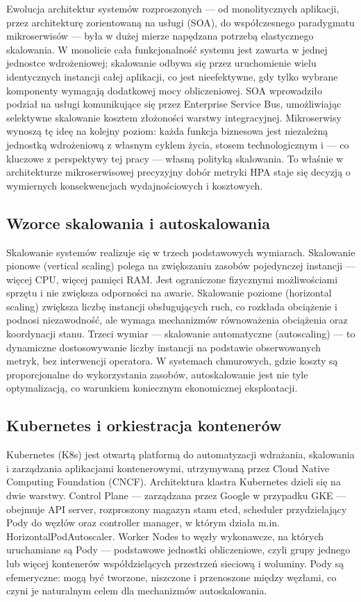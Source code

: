 Ewolucja architektur systemów rozproszonych --- od monolitycznych aplikacji, przez architekturę zorientowaną na usługi (SOA), do współczesnego paradygmatu mikroserwisów --- była w dużej mierze napędzana potrzebą elastycznego skalowania. W monolicie cała funkcjonalność systemu jest zawarta w jednej jednostce wdrożeniowej; skalowanie odbywa się przez uruchomienie wielu identycznych instancji całej aplikacji, co jest nieefektywne, gdy tylko wybrane komponenty wymagają dodatkowej mocy obliczeniowej. SOA wprowadziło podział na usługi komunikujące się przez Enterprise Service Bus, umożliwiając selektywne skalowanie kosztem złożoności warstwy integracyjnej. Mikroserwisy wynoszą tę ideę na kolejny poziom: każda funkcja biznesowa jest niezależną jednostką wdrożeniową z własnym cyklem życia, stosem technologicznym i --- co kluczowe z perspektywy tej pracy --- własną polityką skalowania. To właśnie w architekturze mikroserwisowej precyzyjny dobór metryki HPA staje się decyzją o wymiernych konsekwencjach wydajnościowych i kosztowych.

\subsection{Wzorce skalowania i autoskalowania}

Skalowanie systemów realizuje się w trzech podstawowych wymiarach. Skalowanie pionowe (vertical scaling) polega na zwiększaniu zasobów pojedynczej instancji --- więcej CPU, więcej pamięci RAM. Jest ograniczone fizycznymi możliwościami sprzętu i nie zwiększa odporności na awarie. Skalowanie poziome (horizontal scaling) zwiększa liczbę instancji obsługujących ruch, co rozkłada obciążenie i podnosi niezawodność, ale wymaga mechanizmów równoważenia obciążenia oraz koordynacji stanu. Trzeci wymiar --- skalowanie automatyczne (autoscaling) --- to dynamiczne dostosowywanie liczby instancji na podstawie obserwowanych metryk, bez interwencji operatora. W systemach chmurowych, gdzie koszty są proporcjonalne do wykorzystania zasobów, autoskalowanie jest nie tyle optymalizacją, co warunkiem koniecznym ekonomicznej eksploatacji.

\subsection{Kubernetes i orkiestracja kontenerów}

Kubernetes (K8s) jest otwartą platformą do automatyzacji wdrażania, skalowania i zarządzania aplikacjami kontenerowymi, utrzymywaną przez Cloud Native Computing Foundation (CNCF). Architektura klastra Kubernetes dzieli się na dwie warstwy. Control Plane --- zarządzana przez Google w przypadku GKE --- obejmuje API server, rozproszony magazyn stanu etcd, scheduler przydzielający Pody do węzłów oraz controller manager, w którym działa m.in. HorizontalPodAutoscaler. Worker Nodes to węzły wykonawcze, na których uruchamiane są Pody --- podstawowe jednostki obliczeniowe, czyli grupy jednego lub więcej kontenerów współdzielących przestrzeń sieciową i woluminy. Pody są efemeryczne: mogą być tworzone, niszczone i przenoszone między węzłami, co czyni je naturalnym celem dla mechanizmów autoskalowania.

